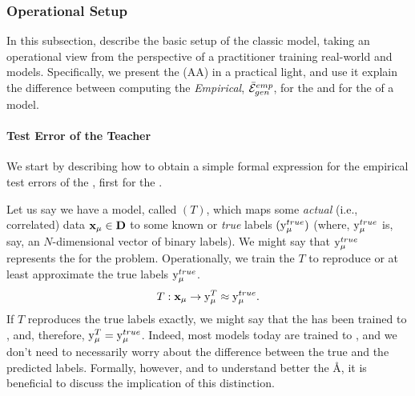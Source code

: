 \subsubsection{Operational Setup}
\label{sxn:ST_OP_setup}


In this subsection, describe the basic setup of the classic \StudentTeacher model, taking an operational view from the perspective of a practitioner training real-world \Student and \Teacher models.  Specifically, we present the \AnnealedApproximation (AA) in a practical light,
and use it explain the difference between computing the \emph{Empirical\GeneralizationError}, $\bar{\mathcal{E}}^{emp}_{gen}$, for the \emph{\TrueAccuracy}
and for the \emph{\Precision} of a \Teacher model.

\paragraph{Test Error of the Teacher}

We start by describing how to obtain a simple formal expression for the empirical test errors of the \Teacher, first for the \TrueAccuracy.

Let us say we have a model, called \Teacher $(T)$, which maps some \emph{actual} (i.e., correlated) data
$\mathbf{x}_{\mu}\in\mathbf{D}$ to some known or \emph{true}  labels $(\mathrm{y}_{\mu}^{true})$
(where,  $\mathrm{y}_{\mu}^{true}$ is, say, an $N$-dimensional vector of binary labels).
We might say that $\mathrm{y}_{\mu}^{true}$ represents the \emph{\GroundTruth} for the problem.
Operationally, we train the \Teacher $T$ to reproduce or at least approximate the true labels $\mathrm{y}_{\mu}^{true}$.
\begin{align}
 T:\mathbf{x}_{\mu}\rightarrow \mathrm{y}_{\mu}^{T} \approx \mathrm{y}_{\mu}^{true}.
\end{align}
If $T$ reproduces the true labels exactly, we might say that the \Teacher has been
trained to \emph{\Interpolation}, and, therefore, $\mathrm{y}_{\mu}^{T} = \mathrm{y}_{\mu}^{true}$.
Indeed, most models today are trained to \emph{\Interpolation}, and we don't need to
necessarily worry about the difference between the true and the predicted \Teacher labels.
Formally, however, and to understand better the \AA, it is beneficial to discuss the implication
of this distinction.

